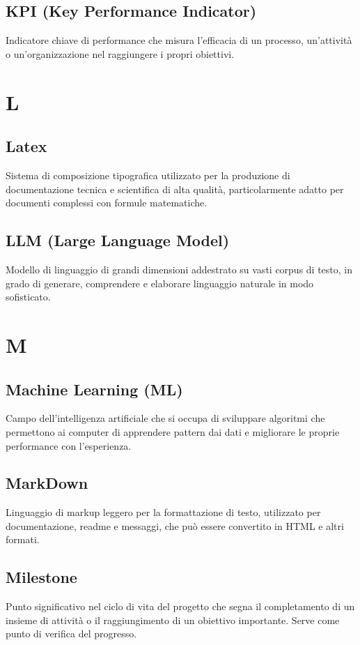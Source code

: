\documentclass[a4paper,11pt]{article}
\begin{document}
\subsection{KPI (Key Performance Indicator)}
Indicatore chiave di performance che misura l'efficacia di un processo, un'attività o un'organizzazione nel raggiungere i propri obiettivi.

\newpage
\section{L}

\subsection{Latex}
Sistema di composizione tipografica utilizzato per la produzione di documentazione tecnica e scientifica di alta qualità, particolarmente adatto per documenti complessi con formule matematiche.

\subsection{LLM (Large Language Model)}
Modello di linguaggio di grandi dimensioni addestrato su vasti corpus di testo, in grado di generare, comprendere e elaborare linguaggio naturale in modo sofisticato.

\newpage
\section{M}

\subsection{Machine Learning (ML)}
Campo dell'intelligenza artificiale che si occupa di sviluppare algoritmi che permettono ai computer di apprendere pattern dai dati e migliorare le proprie performance con l'esperienza.

\subsection{MarkDown}
Linguaggio di markup leggero per la formattazione di testo, utilizzato per documentazione, readme e messaggi, che può essere convertito in HTML e altri formati.

\subsection{Milestone}
Punto significativo nel ciclo di vita del progetto che segna il completamento di un insieme di attività o il raggiungimento di un obiettivo importante. Serve come punto di verifica del progresso.
\end{document}
